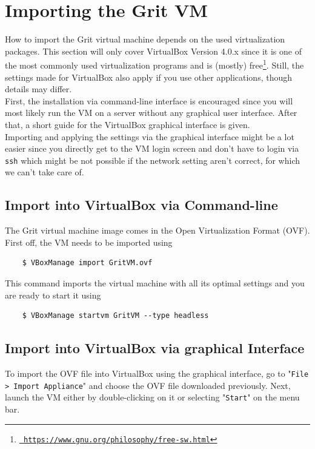 \documentclass[10pt,a4paper, titlepage, toc=idx]{scrreprt}
\theoremstyle{definition}
\theoremstyle{plain}
\newcommand*{\product}{Grit}
\begin{document}
\section{Importing the \product{} VM} \label{gritvm} How to import the
\product{} virtual machine depends on the used virtualization packages.
This section will only cover VirtualBox Version 4.0.x since it is one
of the most commonly used virtualization programs and is (mostly)
free\footnote{\href{https://www.gnu.org/philosophy/free-sw.html}{{\tt
      https://www.gnu.org/philosophy/free-sw.html}}}.  Still, the
settings made for VirtualBox also apply if you use other
applications, though details may differ.\\
First, the installation via command-line interface is encouraged since
you will most likely run the VM on a server without any graphical user
interface. After that, a short
guide for the VirtualBox graphical interface is given.\\
Importing and applying the settings via the graphical interface might
be a lot easier since you directly get to the VM login screen and
don't have to login via {\tt ssh} which might be not possible if the
network setting aren't correct, for which we can't take care of.
\subsection{Import into VirtualBox via Command-line}
The \product{} virtual machine image comes in the Open Virtualization
Format (OVF). First off, the VM needs to be imported using
\begin{lstlisting}
	$ VBoxManage import GritVM.ovf
\end{lstlisting}
This command imports the virtual machine with all its optimal settings
and you are ready to start it using
\begin{lstlisting}
	$ VBoxManage startvm GritVM --type headless
\end{lstlisting}
	
	\subsection{Import into VirtualBox via graphical Interface}
	To import the OVF file into VirtualBox using the graphical
        interface, go to "{\tt File > Import Appliance}" and choose
        the OVF file downloaded previously. Next, launch the VM either
        by double-clicking on it or selecting "{\tt Start}" on the
        menu bar.
\end{document}
